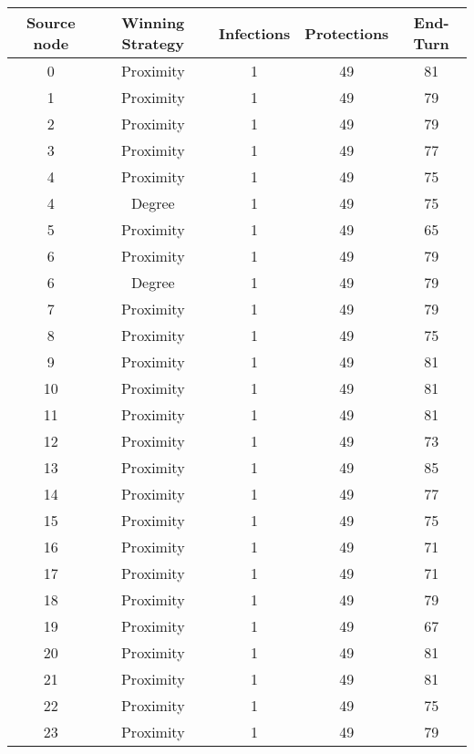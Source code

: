 \documentclass[results.tex]{subfiles}
\begin{document}
\begin{center}
  \begin{tabular}{| c || c | c | c | c |}
    \hline
    {\bfseries Source node} & {\bfseries Winning Strategy} & {\bfseries Infections} & {\bfseries Protections} & {\bfseries End-Turn} \\  %
    \hline\hline
    0 & Proximity & 1 & 49 & 81 \\ 
    \hline
    1 & Proximity & 1 & 49 & 79 \\ 
    \hline
    2 & Proximity & 1 & 49 & 79 \\ 
    \hline
    3 & Proximity & 1 & 49 & 77 \\ 
    \hline
    4 & Proximity & 1 & 49 & 75 \\ 
    \hline
    4 & Degree & 1 & 49 & 75 \\ 
    \hline
    5 & Proximity & 1 & 49 & 65 \\ 
    \hline
    6 & Proximity & 1 & 49 & 79 \\ 
    \hline
    6 & Degree & 1 & 49 & 79 \\ 
    \hline
    7 & Proximity & 1 & 49 & 79 \\ 
    \hline
    8 & Proximity & 1 & 49 & 75 \\ 
    \hline
    9 & Proximity & 1 & 49 & 81 \\ 
    \hline
    10 & Proximity & 1 & 49 & 81 \\ 
    \hline
    11 & Proximity & 1 & 49 & 81 \\ 
    \hline
    12 & Proximity & 1 & 49 & 73 \\ 
    \hline
    13 & Proximity & 1 & 49 & 85 \\ 
    \hline
    14 & Proximity & 1 & 49 & 77 \\ 
    \hline
    15 & Proximity & 1 & 49 & 75 \\ 
    \hline
    16 & Proximity & 1 & 49 & 71 \\ 
    \hline
    17 & Proximity & 1 & 49 & 71 \\ 
    \hline
    18 & Proximity & 1 & 49 & 79 \\ 
    \hline
    19 & Proximity & 1 & 49 & 67 \\ 
    \hline
    20 & Proximity & 1 & 49 & 81 \\ 
    \hline
    21 & Proximity & 1 & 49 & 81 \\ 
    \hline
    22 & Proximity & 1 & 49 & 75 \\ 
    \hline
    23 & Proximity & 1 & 49 & 79 \\ 

\end{tabular}
\end{center}
\end{document}

